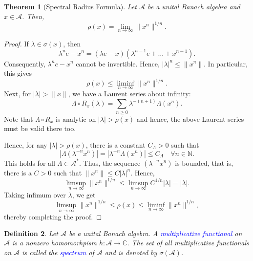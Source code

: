 \documentclass[11pt]{article}
\theoremstyle{thmstyle}
\newtheorem{theorem}{Theorem}[section]
\theoremstyle{defstyle}
\newtheorem{definition}[theorem]{Definition}
\newcommand{\N}{\mathbb{N}}
\newcommand{\bbC}{\mathbb{C}}
\newcommand{\calA}{\mathcal{A}} %
\newcommand{\define}[1]{\textcolor{blue}{\textit{#1}}}
\renewcommand{\le}{\leqslant}
\renewcommand{\ge}{\geqslant}
\begin{document}
\begin{theorem}[Spectral Radius Formula]
    Let $\calA$ be a unital Banach algebra and $x\in\calA$. Then, 
    \begin{equation*}
        \rho(x) = \lim_{n\to\infty}\|x^n\|^{1/n}.
    \end{equation*}
\end{theorem}
\begin{proof}
    If $\lambda\in\sigma(x)$, then 
    \begin{equation*}
        \lambda^ne - x^n = (\lambda e - x)\left(\lambda^{n - 1}e + \dots + x^{n - 1}\right).
    \end{equation*}
    Consequently, $\lambda^n e - x^n$ cannot be invertible. Hence, $|\lambda|^n\le\|x^n\|$. In particular, this gives 
    \begin{equation*}
        \rho(x)\le\liminf_{n\to\infty} \|x^n\|^{1/n}.
    \end{equation*}
    Next, for $|\lambda| > \|x\|$, we have a Laurent series about infinity: 
    \begin{equation*}
        \Lambda\circ R_x(\lambda) = \sum_{n\ge 0}\lambda^{-(n + 1)}\Lambda(x^n).
    \end{equation*}
    Note that $\Lambda\circ R_x$ is analytic on $|\lambda| > \rho(x)$ and hence, the above Laurent series must be valid there too.

    Hence, for any $|\lambda| > \rho(x)$, there is a constant $C_\Lambda > 0$ such that 
    \begin{equation*}
        |\Lambda(\lambda^{-n}x^n)| = |\lambda^{-n}\Lambda(x^n)|\le C_\Lambda\quad\forall n\in\N.
    \end{equation*}
    This holds for all $\Lambda\in\calA^\ast$. Thus, the sequence $(\lambda^{-n}x^n)$ is bounded, that is, there is a $C > 0$ such that $\|x^n\|\le C|\lambda|^n$. Hence, 
    \begin{equation*}
        \limsup_{n\to\infty}\|x^n\|^{1/n}\le\limsup_{n\to\infty} C^{1/n}|\lambda| = |\lambda|.
    \end{equation*}
    Taking infimum over $\lambda$, we get 
    \begin{equation*}
        \limsup_{n\to\infty}\|x^n\|^{1/n}\le\rho(x)\le\liminf_{n\to\infty}\|x^n\|^{1/n},
    \end{equation*}
    thereby completing the proof.
\end{proof}

\begin{definition}
    Let $\calA$ be a unital Banach algebra. A \define{multiplicative functional} on $\calA$ is a \emph{nonzero} homomorhpism $h:\calA\to\bbC$. The set of all multiplicative functionals on $\calA$ is called the \define{spectrum} of $\calA$ and is denoted by $\sigma(\calA)$.
\end{definition}
\end{document}
